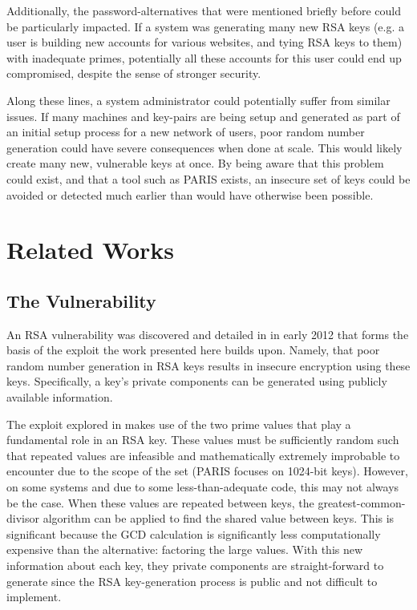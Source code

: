 \documentclass[12pt]{ucthesis}
\begin{document}
Additionally, the password-alternatives that were mentioned briefly before
could be particularly impacted. If a system was generating many new RSA keys
(e.g. a user is building new accounts for various websites, and tying RSA keys
to them) with inadequate primes, potentially all these accounts for this user
could end up compromised, despite the sense of stronger security.

Along these lines, a system administrator could potentially suffer from similar
issues. If many machines and key-pairs are being setup and generated as part of
an initial setup process for a new network of users, poor random number
generation could have severe consequences when done at scale. This would likely
create many new, vulnerable keys at once. By being aware that this problem
could exist, and that a tool such as PARIS exists, an insecure set of keys 
could be avoided or detected much earlier than would have otherwise been
possible.  


\chapter{Related Works}
\label{sec:related}

\section{The Vulnerability}
\label{subsec:vuln}
An RSA vulnerability was discovered and detailed in \cite{lenstra2012ron} in
early 2012 that forms the basis of the exploit the work presented here builds
upon. Namely, that poor random number generation in RSA keys results in
insecure encryption using these keys. Specifically, a key's private components
can be generated using publicly available information.

The exploit explored in \cite{lenstra2012ron} makes use of the two prime
values that play a fundamental role in an RSA key. These values must be
sufficiently random such that repeated values are infeasible and mathematically
extremely improbable to encounter due to the scope of the set (PARIS focuses on
1024-bit keys). However, on some systems and due to some less-than-adequate
code, this may not always be the case. When these values are repeated between
keys, the greatest-common-divisor algorithm can be applied to find the shared
value between keys. This is significant because the GCD calculation is
significantly less computationally expensive than the alternative: factoring
the large values. With this new information about each key, they private
components are straight-forward to generate since the RSA key-generation
process is public and not difficult to implement.  
\end{document}
